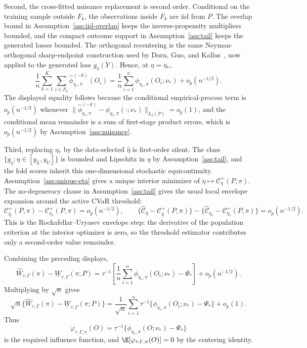 Second, the cross-fitted nuisance replacement is second order.  Conditional on the training sample outside
\(F_k\), the observations inside \(F_k\) are iid from \(P\).  The overlap bound in
Assumption~\ref{ass:iid-overlap} keeps the inverse-propensity multipliers bounded, and the compact outcome support in Assumption~\ref{ass:tail} keeps the generated losses bounded.  The orthogonal recentering is the same Neyman-orthogonal sharp-endpoint construction used by Dorn, Guo, and Kallus~\cite{DornGuoKallus2021DoublySharp}, now applied to the generated loss \(g_\eta(Y)\).  Hence, at \(\eta=\eta_*\),
\[
\frac1n\sum_{k=1}^K\sum_{i\in F_k}
\widehat\phi_{\eta_*,\pi}^{(-k)}(O_i)
=
\frac1n\sum_{i=1}^n\phi_{\eta_*,\pi}(O_i;\nu_*)
+o_p(n^{-1/2}).
\]
The displayed equality follows because the conditional empirical-process term is
\(o_p(n^{-1/2})\) whenever
\(\|\widehat\phi_{\eta_*,\pi}^{(-k)}-\phi_{\eta_*,\pi}(\cdot;\nu_*)\|_{L_2(P)}=o_p(1)\), and the conditional mean remainder is a sum of first-stage product errors, which is
\(o_p(n^{-1/2})\) by Assumption~\ref{ass:nuisance}.

Third, replacing \(\eta_*\) by the data-selected \(\widehat\eta\) is first-order silent.  The class
\(\{g_\eta:\eta\in[y_L,y_U]\}\) is bounded and Lipschitz in \(\eta\) by Assumption~\ref{ass:tail}\), and the fold scores inherit this one-dimensional stochastic equicontinuity.  Assumption~\ref{ass:unique-eta} gives a unique interior minimizer of \(\eta\mapsto\mathcal C_\eta^{+}(P,\pi)\).  The no-degeneracy clause in Assumption~\ref{ass:tail} gives the usual local envelope expansion around the active CVaR threshold:
\[
\mathcal C_{\widehat\eta}^{+}(P,\pi)-\mathcal C_{\eta_*}^{+}(P,\pi)=o_p(n^{-1/2}),
\qquad
\bigl\{\widehat{\mathcal C}_{\widehat\eta}-\mathcal C_{\widehat\eta}^{+}(P,\pi)\bigr\}
-\bigl\{\widehat{\mathcal C}_{\eta_*}-\mathcal C_{\eta_*}^{+}(P,\pi)\bigr\}
=o_p(n^{-1/2}).
\]
This is the Rockafellar--Uryasev envelope step: the derivative of the population criterion at the interior optimizer is zero, so the threshold estimator contributes only a second-order value remainder.

Combining the preceding displays,
\[
\widehat W_{\tau,\Gamma}(\pi)-\underline W_{\tau,\Gamma}(\pi;P)
=
\tau^{-1}\left[
\frac1n\sum_{i=1}^n\phi_{\eta_*,\pi}(O_i;\nu_*)-\Psi_*
\right]
+o_p(n^{-1/2}).
\]
Multiplying by \(\sqrt n\) gives
\[
\sqrt n\{\widehat W_{\tau,\Gamma}(\pi)-\underline W_{\tau,\Gamma}(\pi;P)\}
=
\frac1{\sqrt n}\sum_{i=1}^n
\tau^{-1}\{\phi_{\eta_*,\pi}(O_i;\nu_*)-\Psi_*\}
+o_p(1).
\]
Thus
\[
\varphi_{\tau,\Gamma,\pi}(O)
=
\tau^{-1}\{\phi_{\eta_*,\pi}(O;\nu_*)-\Psi_*\}
\]
is the required influence function, and \(\E[\varphi_{\tau,\Gamma,\pi}(O)]=0\) by the centering identity.

